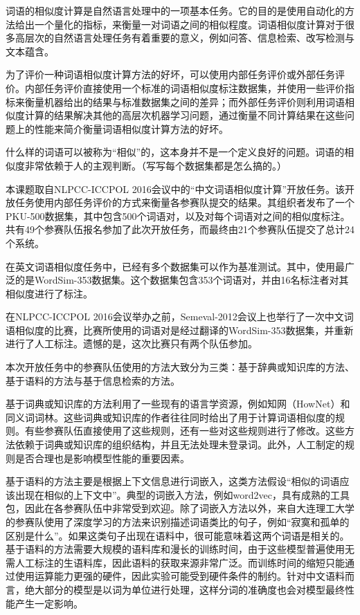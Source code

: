 
词语的相似度计算是自然语言处理中的一项基本任务。它的目的是使用自动化的方法给出一个量化的指标，来衡量一对词语之间的相似程度。词语相似度计算对于很多高层次的自然语言处理任务有着重要的意义，例如问答、信息检索、改写检测与文本蕴含。

为了评价一种词语相似度计算方法的好坏，可以使用内部任务评价或外部任务评价。内部任务评价直接使用一个标准的词语相似度标注数据集，并使用一些评价指标来衡量机器给出的结果与标准数据集之间的差异；而外部任务评价则利用词语相似度计算的结果解决其他的高层次机器学习问题，通过衡量不同计算结果在这些问题上的性能来简介衡量词语相似度计算方法的好坏。

什么样的词语可以被称为“相似”的，这本身并不是一个定义良好的问题。词语的相似度非常依赖于人的主观判断。（写写每个数据集都是怎么搞的。）

本课题取自NLPCC-ICCPOL 2016会议中的“中文词语相似度计算”开放任务。该开放任务使用内部任务评价的方式来衡量各参赛队提交的结果。其组织者发布了一个PKU-500数据集，其中包含500个词语对，以及对每个词语对之间的相似度标注。共有49个参赛队伍报名参加了此次开放任务，而最终由21个参赛队伍提交了总计24个系统。

在英文词语相似度任务中，已经有多个数据集可以作为基准测试。其中，使用最广泛的是WordSim-353数据集。这个数据集包含353个词语对，并由16名标注者对其相似度进行了标注。

在NLPCC-ICCPOL 2016会议举办之前，Semeval-2012会议上也举行了一次中文词语相似度的比赛，比赛所使用的词语对是经过翻译的WordSim-353数据集，并重新进行了人工标注。遗憾的是，这次比赛只有两个队伍参加。

本次开放任务中的参赛队伍使用的方法大致分为三类：基于辞典或知识库的方法、基于语料的方法与基于信息检索的方法。

基于词典或知识库的方法利用了一些现有的语言学资源，例如知网（HowNet）和同义词词林。这些词典或知识库的作者往往同时给出了用于计算词语相似度的规则。有些参赛队伍直接使用了这些规则，还有一些对这些规则进行了修改。这些方法依赖于词典或知识库的组织结构，并且无法处理未登录词。此外，人工制定的规则是否合理也是影响模型性能的重要因素。

基于语料的方法主要是根据上下文信息进行词嵌入，这类方法假设“相似的词语应该出现在相似的上下文中”。典型的词嵌入方法，例如word2vec，具有成熟的工具包，因此在各参赛队伍中非常受到欢迎。除了词嵌入方法以外，来自大连理工大学的参赛队使用了深度学习的方法来识别描述词语类比的句子，例如“寂寞和孤单的区别是什么”。如果这类句子出现在语料中，很可能意味着这两个词语是相关的。基于语料的方法需要大规模的语料库和漫长的训练时间，由于这些模型普遍使用无需人工标注的生语料库，因此语料的获取来源非常广泛。而训练时间的缩短只能通过使用运算能力更强的硬件，因此实验可能受到硬件条件的制约。针对中文语料而言，绝大部分的模型是以词为单位进行处理，这样分词的准确度也会对模型最终性能产生一定影响。

